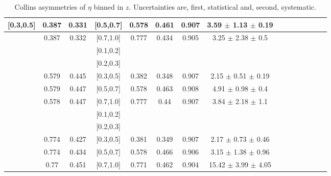 \begin{table}[H]
\begin{tabular}{|c| c| c| c| c| c| c| c| c| c|c| c| c| c| c|}
[0.3,0.5]	&	0.387	&	0.331	&	[0.5,0.7]	&	0.578	&	0.461	&	0.907	&	3.59  $\pm$ 1.13  $\pm$ 0.19    \\ \hline
[0.3,0.5]	&	0.387	&	0.332	&	[0.7,1.0]	&	0.777	&	0.434	&	0.905	&	3.25  $\pm$ 2.38  $\pm$ 0.5  	\\ \hline
\hline
[0.5,0.7]	&		&		&	[0.1,0.2]	&		&		&		&							\\ \hline
[0.5,0.7]	&		&		&	[0.2,0.3]	&		&		&		&							\\ \hline
[0.5,0.7]	&	0.579	&	0.445	&	[0.3,0.5]	&	0.382	&	0.348	&	0.907	&  2.15  $\pm$ 0.51  $\pm$ 0.19  \\ \hline
[0.5,0.7]	&	0.579	&	0.447	&	[0.5,0.7]	&	0.578	&	0.463	&	0.908	&  4.91  $\pm$ 0.98  $\pm$ 0.4   \\ \hline
[0.5,0.7]	&	0.578	&	0.447	&	[0.7,1.0]	&	0.777	&	0.44	&	0.907	&  3.84  $\pm$ 2.18  $\pm$ 1.1   \\ \hline
\hline
[0.7,1.0]	&		&		&	[0.1,0.2]	&		&		&		&							\\ \hline
[0.7,1.0]	&		&		&	[0.2,0.3]	&		&		&		&							\\ \hline
[0.7,1.0]	&	0.774	&	0.427	&	[0.3,0.5]	&	0.381	&	0.349	&	0.907	& 2.17  $\pm$ 0.73  $\pm$ 0.46  	\\ \hline
[0.7,1.0]	&	0.774	&	0.434	&	[0.5,0.7]	&	0.578	&	0.466	&	0.906	& 3.15  $\pm$ 1.38  $\pm$ 0.96     \\ \hline
[0.7,1.0]	&	0.77	&	0.451	&	[0.7,1.0]	&	0.771	&	0.462	&	0.904	& 15.42  $\pm$ 3.99  $\pm$ 4.05    \\ \hline
\end{tabular}
\caption[Collins asymmetries of $\eta$ binned in $z$]{Collins asymmetries of $\eta$ binned in $z$. Uncertainties are, first, statistical and, second, systematic.}
\label{tab:finaletazbin}
\end{table}

